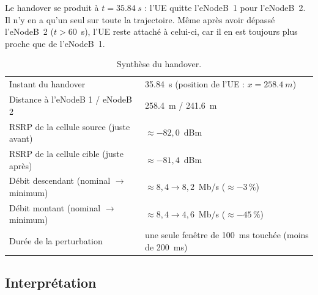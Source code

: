 Le handover se produit à $t=\SI{35.84}{s}$ : l'UE quitte l'eNodeB~1 pour
l'eNodeB~2. Il n'y en a qu'un seul sur toute la trajectoire. Même après avoir
dépassé l'eNodeB~2 ($t>60$~s), l'UE reste attaché à celui-ci, car il en est
toujours plus proche que de l'eNodeB~1.




\begin{table}[H]
\centering
\caption{Synthèse du handover.}
\label{tab:A-q6}
\small
\begin{tabular}{@{}ll@{}}
\toprule
Instant du handover & \SI{35.84}{s} (position de l'UE : $x=\SI{258.4}{m}$) \\
Distance à l'eNodeB 1 / eNodeB 2 & \SI{258.4}{m} / \SI{241.6}{m} \\
RSRP de la cellule source (juste avant) & $\approx -82{,}0$~dBm \\
RSRP de la cellule cible (juste après) & $\approx -81{,}4$~dBm \\
Débit descendant (nominal $\to$ minimum) & $\approx 8{,}4 \to 8{,}2$~Mb/s ($\approx -3\,\%$) \\
Débit montant (nominal $\to$ minimum) & $\approx 8{,}4 \to 4{,}6$~Mb/s ($\approx -45\,\%$) \\
Durée de la perturbation & une seule fenêtre de \SI{100}{ms} touchée (moins de \SI{200}{ms}) \\
\bottomrule
\end{tabular}
\end{table}

\subsection{Interprétation}

